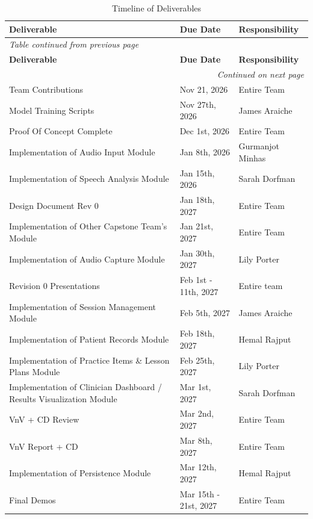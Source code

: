 \documentclass[12pt, titlepage]{article}
\begin{document}
\begin{longtable}{p{} p{} p{}}
\caption{Timeline of Deliverables}\label{TblTimeline}\\
\toprule
\textbf{Deliverable} & \textbf{Due Date} & \textbf{Responsibility}\\
\midrule
\endfirsthead

\multicolumn{3}{l}{\textit{Table \thetable{} continued from previous page}}\\
\toprule
\textbf{Deliverable} & \textbf{Due Date} & \textbf{Responsibility}\\
\midrule
\endhead

\midrule
\multicolumn{3}{r}{\textit{Continued on next page}}\\
\endfoot

\bottomrule
\endlastfoot

Team Contributions & Nov 21, 2026 & Entire Team\\
Model Training Scripts & Nov 27th, 2026 & James Araiche\\
Proof Of Concept Complete & Dec 1st, 2026 & Entire Team\\
Implementation of Audio Input Module & Jan 8th, 2026 & Gurmanjot Minhas\\
Implementation of Speech Analysis Module & Jan 15th, 2026 & Sarah Dorfman\\
Design Document Rev 0 & Jan 18th, 2027 & Entire Team\\
Implementation of Other Capstone Team's Module & Jan 21st, 2027 & Entire Team\\
Implementation of Audio Capture Module & Jan 30th, 2027 & Lily Porter\\
Revision 0 Presentations & Feb 1st - 11th, 2027 & Entire team\\
Implementation of Session Management Module & Feb 5th, 2027 & James Araiche\\
Implementation of Patient Records Module & Feb 18th, 2027 & Hemal Rajput\\
Implementation of Practice Items \& Lesson Plans Module & Feb 25th, 2027 & Lily Porter\\
Implementation of Clinician Dashboard / Results Visualization Module & Mar 1st, 2027 & Sarah Dorfman\\
VnV + CD Review & Mar 2nd, 2027 & Entire Team\\
VnV Report + CD & Mar 8th, 2027 & Entire Team\\
Implementation of Persistence Module & Mar 12th, 2027 & Hemal Rajput\\
Final Demos & Mar 15th - 21st, 2027 & Entire Team\\

\end{longtable}
\end{document}
